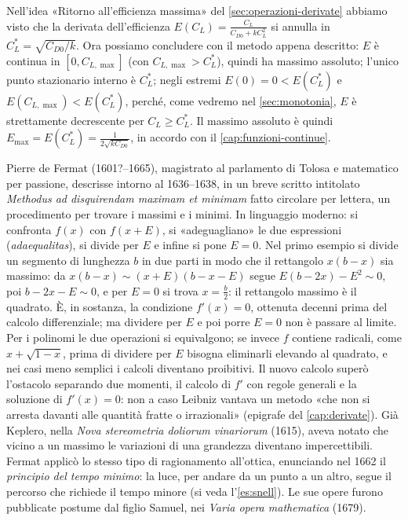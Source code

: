 \begin{idea}
Nell'idea «Ritorno all'efficienza massima» del \cref{sec:operazioni-derivate} abbiamo
visto che la derivata dell'efficienza $E(C_{L})=\frac{C_{L}}{C_{D0}+kC_{L}^{2}}$ si annulla
in $C_{L}^{*}=\sqrt{C_{D0}/k}$. Ora possiamo concludere con il metodo appena descritto:
$E$ è continua in $[0,C_{L,\max}]$ (con $C_{L,\max}>C_{L}^{*}$), quindi ha massimo
assoluto; l'unico punto stazionario interno è $C_{L}^{*}$; negli estremi
$E(0)=0<E(C_{L}^{*})$ e $E(C_{L,\max})<E(C_{L}^{*})$, perché, come vedremo nel
\cref{sec:monotonia}, $E$ è strettamente decrescente per $C_{L}\ge C_{L}^{*}$. Il massimo assoluto è
quindi $E_{\max}=E(C_{L}^{*})=\frac1{2\sqrt{kC_{D0}}}$, in accordo con il
\cref{cap:funzioni-continue}.
\end{idea}

\begin{notastorica}
Pierre de Fermat (1601?--1665), magistrato al parlamento di Tolosa e matematico per
passione, descrisse intorno al 1636--1638, in un breve scritto intitolato
\emph{Methodus ad disquirendam maximam et minimam} fatto circolare per lettera, un
procedimento per trovare i massimi e i minimi. In linguaggio moderno: si confronta
$f(x)$ con $f(x+E)$, si «adeguagliano» le due espressioni (\emph{adaequalitas}), si
divide per $E$ e infine si pone $E=0$. Nel primo esempio si divide un segmento di
lunghezza $b$ in due parti in modo che il rettangolo $x(b-x)$ sia massimo: da
$x(b-x)\sim(x+E)(b-x-E)$ segue $E(b-2x)-E^{2}\sim0$, poi $b-2x-E\sim0$, e per $E=0$ si
trova $x=\frac b2$: il rettangolo massimo è il quadrato. È, in sostanza, la condizione
$f'(x)=0$, ottenuta decenni prima del calcolo differenziale; ma dividere per $E$ e poi
porre $E=0$ non è passare al limite. Per i polinomi le due operazioni si equivalgono; se
invece $f$ contiene radicali, come $x+\sqrt{1-x}$, prima di dividere per $E$ bisogna
eliminarli elevando al quadrato, e nei casi meno semplici i calcoli diventano
proibitivi. Il nuovo calcolo superò l'ostacolo separando due momenti, il calcolo di $f'$
con regole generali e la soluzione di $f'(x)=0$: non a caso Leibniz vantava un metodo
«che non si arresta davanti alle quantità fratte o irrazionali» (epigrafe del
\cref{cap:derivate}). Già Keplero, nella \emph{Nova stereometria doliorum vinariorum}
(1615), aveva notato che vicino a un massimo le variazioni di una grandezza diventano
impercettibili. Fermat applicò lo stesso tipo di ragionamento all'ottica, enunciando nel
1662 il \emph{principio del tempo minimo}: la
luce, per andare da un punto a un altro, segue il percorso che richiede il tempo
minore (si veda l'\cref{es:snell}). Le sue opere furono pubblicate postume dal figlio
Samuel, nei \emph{Varia opera mathematica} (1679).
\end{notastorica}
